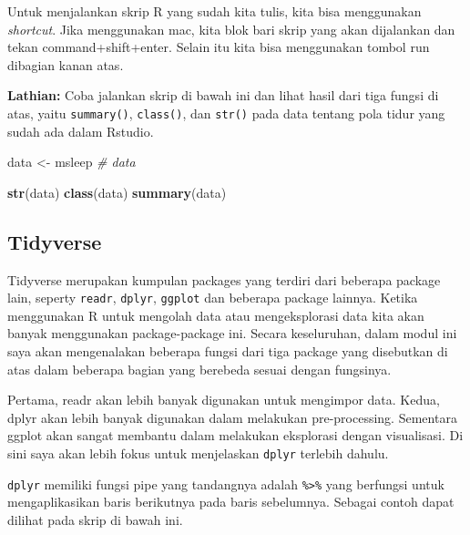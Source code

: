 \documentclass[]{book}
\newenvironment{Shaded}{\begin{snugshade}}{\end{snugshade}}
\newcommand{\CommentTok}[1]{\textcolor[rgb]{0.56,0.35,0.01}{\textit{#1}}}
\newcommand{\DecValTok}[1]{\textcolor[rgb]{0.00,0.00,0.81}{#1}}
\newcommand{\KeywordTok}[1]{\textcolor[rgb]{0.13,0.29,0.53}{\textbf{#1}}}
\newcommand{\NormalTok}[1]{#1}
\newcommand{\OperatorTok}[1]{\textcolor[rgb]{0.81,0.36,0.00}{\textbf{#1}}}
\newcommand{\StringTok}[1]{\textcolor[rgb]{0.31,0.60,0.02}{#1}}
\begin{document}
Untuk menjalankan skrip R yang sudah kita tulis, kita bisa menggunakan
\emph{shortcut}. Jika menggunakan mac, kita blok bari skrip yang akan
dijalankan dan tekan command+shift+enter. Selain itu kita bisa
menggunakan tombol run dibagian kanan atas.

\textbf{Lathian:} Coba jalankan skrip di bawah ini dan lihat hasil dari
tiga fungsi di atas, yaitu \texttt{summary()}, \texttt{class()}, dan
\texttt{str()} pada data tentang pola tidur yang sudah ada dalam
Rstudio.

\begin{Shaded}
\begin{Highlighting}[]
\NormalTok{data <-}\StringTok{ }\NormalTok{msleep }\CommentTok{# data}

\KeywordTok{str}\NormalTok{(data)}
\KeywordTok{class}\NormalTok{(data)}
\KeywordTok{summary}\NormalTok{(data)}
\end{Highlighting}
\end{Shaded}

\hypertarget{tidyverse}{%
\subsection{Tidyverse}\label{tidyverse}}

Tidyverse merupakan kumpulan packages yang terdiri dari beberapa package
lain, seperty \texttt{readr}, \texttt{dplyr}, \texttt{ggplot} dan
beberapa package lainnya. Ketika menggunakan R untuk mengolah data atau
mengeksplorasi data kita akan banyak menggunakan package-package ini.
Secara keseluruhan, dalam modul ini saya akan mengenalakan beberapa
fungsi dari tiga package yang disebutkan di atas dalam beberapa bagian
yang berebeda sesuai dengan fungsinya.

Pertama, readr akan lebih banyak digunakan untuk mengimpor data. Kedua,
dplyr akan lebih banyak digunakan dalam melakukan pre-processing.
Sementara ggplot akan sangat membantu dalam melakukan eksplorasi dengan
visualisasi. Di sini saya akan lebih fokus untuk menjelaskan
\texttt{dplyr} terlebih dahulu.

\texttt{dplyr} memiliki fungsi pipe yang tandangnya adalah
\texttt{\%\textgreater{}\%} yang berfungsi untuk mengaplikasikan baris
berikutnya pada baris sebelumnya. Sebagai contoh dapat dilihat pada
skrip di bawah ini.

\begin{Shaded}
\end{Shaded}
\end{document}
